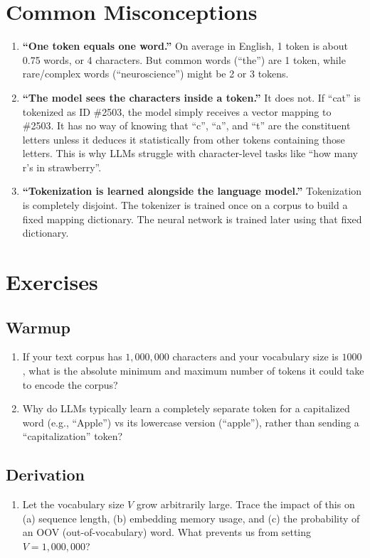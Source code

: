 \section{Common Misconceptions}
\label{ch:07:sec:misconceptions}

\begin{enumerate}
  \item \textbf{``One token equals one word.''} On average in English, 1 token is about 0.75 words, or 4 characters. But common words (``the'') are 1 token, while rare/complex words (``neuroscience'') might be 2 or 3 tokens.
  \item \textbf{``The model sees the characters inside a token.''} It does not. If ``cat'' is tokenized as ID \#2503, the model simply receives a vector mapping to \#2503. It has no way of knowing that ``c'', ``a'', and ``t'' are the constituent letters unless it deduces it statistically from other tokens containing those letters. This is why LLMs struggle with character-level tasks like ``how many r's in strawberry''.
  \item \textbf{``Tokenization is learned alongside the language model.''} Tokenization is completely disjoint. The tokenizer is trained once on a corpus to build a fixed mapping dictionary. The neural network is trained later using that fixed dictionary.
\end{enumerate}


\section{Exercises}
\label{ch:07:sec:exercises}

\subsection*{Warmup}
\begin{enumerate}
  \item If your text corpus has $1,000,000$ characters and your vocabulary size is $1000$, what is the absolute minimum and maximum number of tokens it could take to encode the corpus?
  \item Why do LLMs typically learn a completely separate token for a capitalized word (e.g., ``Apple'') vs its lowercase version (``apple''), rather than sending a ``capitalization'' token?
\end{enumerate}

\subsection*{Derivation}
\begin{enumerate}
  \item Let the vocabulary size $V$ grow arbitrarily large. Trace the impact of this on (a) sequence length, (b) embedding memory usage, and (c) the probability of an OOV (out-of-vocabulary) word. What prevents us from setting $V = 1,000,000$?
\end{enumerate}

